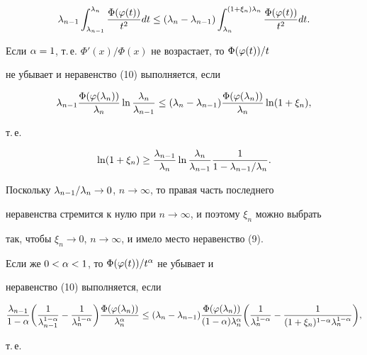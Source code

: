 \begin{equation}


\la_{n-1}\int_{\la_{n-1}}^{\la_n}\frac{\Phi(\p(t))}{t^2}dt\le


(\la_n-\la_{n-1})\int_{\la_n}^{(1+\xi_n)\la_n}\frac{\Phi(\p(t))}{t^2}dt.


\end{equation}





Если $\alpha=1$, т.\,е. $\Phi'(x)/\Phi(x)$ не возрастает, то $\Phi(\varphi(t))/t$


не убывает и неравенство (10) выполняется, если


$$


\la_{n-1}\frac{\Phi(\p(\la_n))}{\la_n}\ln\frac{\la_n}{\la_{n-1}}\le


(\la_n-\la_{n-1})\frac{\Phi(\p(\la_n))}{\la_n}\ln(1+\xi_n),


$$


т.\,е.


$$


\ln(1+\xi_n)\ge\frac{\la_{n-1}}{\la_n}\ln\frac{\la_n}{\la_{n-1}}


\frac{1}{1-\la_{n-1}/\la_n}.


$$


Поскольку $\lambda_{n-1}/\lambda_n\to 0$, $n\to\infty$, то правая часть последнего 


неравенства стремится к нулю при $n\to\infty$, и поэтому $\xi_n$ можно выбрать


так, чтобы $\xi_n\to 0$, $n\to\infty$, и имело место неравенство (9).





Если же $0<\alpha<1$, то $\Phi(\varphi(t))/t^{\alpha}$ не убывает и


неравенство (10) выполняется, если


$$


\frac{\la_{n-1}}{1-\al}\biggl(\frac{1}{\la_{n-1}^{1-\al}}-


\frac{1}{\la_n^{1-\al}}\biggr)


\frac{\Phi(\p(\la_n))}{\la_n^{\al}}\le


(\la_n-\la_{n-1})\frac{\Phi(\p(\la_n))}{(1-\al)\la_n^{\al}}


\biggl(\frac{1}{\la_n^{1-\al}}-


\frac{1}{(1+\xi_n)^{1-\al}\la_n^{1-\al}}\biggr),


$$


т.\,е.


$$


